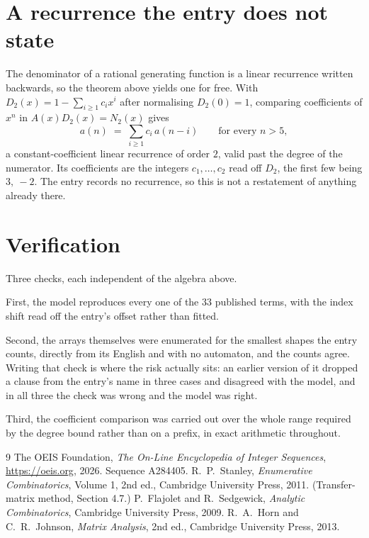 \documentclass[11pt,a4paper]{article}
\theoremstyle{plain}
\theoremstyle{definition}
\begin{document}
\section{A recurrence the entry does not state}

The denominator of a rational generating function is a linear recurrence written backwards, so
the theorem above yields one for free. With $D_2(x)=1-\sum_{i\ge1}c_ix^i$ after normalising
$D_2(0)=1$, comparing coefficients of $x^n$ in $A(x)D_2(x)=N_2(x)$ gives
\[
a(n)\;=\;\sum_{i\ge1}c_i\,a(n-i)\qquad\text{for every }n>5,
\]
a constant-coefficient linear recurrence of order $2$, valid past the degree of the
numerator. Its coefficients are the integers $c_1,\dots,c_{2}$ read off $D_2$, the first few being $3,\ -2$. The entry records no recurrence, so this is not a restatement of anything
already there.

\section{Verification}

Three checks, each independent of the algebra above.

First, the model reproduces every one of the $33$ published terms, with the index shift
read off the entry's offset rather than fitted.

Second, the arrays themselves were enumerated for the smallest shapes the entry counts,
directly from its English and with no automaton, and the counts agree. Writing that check is
where the risk actually sits: an earlier version of it dropped a clause from the entry's name
in three cases and disagreed with the model, and in all three the check was wrong and the model
was right.

Third, the coefficient comparison was carried out over the whole range required by the degree
bound rather than on a prefix, in exact arithmetic throughout.

\begin{thebibliography}{9}
 The OEIS Foundation, \emph{The On-Line Encyclopedia of Integer
Sequences}, \url{https://oeis.org}, 2026. Sequence A284405.
 R.~P.~Stanley, \emph{Enumerative Combinatorics}, Volume 1, 2nd ed.,
Cambridge University Press, 2011. (Transfer-matrix method, Section 4.7.)
 P.~Flajolet and R.~Sedgewick, \emph{Analytic Combinatorics}, Cambridge
University Press, 2009.
 R.~A.~Horn and C.~R.~Johnson, \emph{Matrix Analysis}, 2nd ed., Cambridge
University Press, 2013.
\end{thebibliography}
\end{document}
